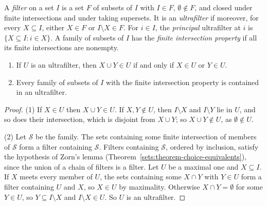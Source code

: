 \begin{definition}\label{model-theory:definition-ultrafilter}
A \emph{filter} on a set $I$ is a set $F$ of subsets of $I$ with $I \in F$, $\emptyset \notin F$, and closed under finite intersections and under taking
supersets. It is an \emph{ultrafilter} if moreover, for every $X \subseteq I$, either $X \in F$ or $I \setminus X \in F$. For $i \in I$, the \emph{principal}
ultrafilter at $i$ is $\{X \subseteq I : i \in X\}$. A family of subsets of $I$ has the \emph{finite intersection property} if all its finite intersections are
nonempty.
\end{definition}

\begin{lemma}\label{model-theory:lemma-ultrafilters}
\begin{enumerate}
\item If $U$ is an ultrafilter, then $X \cup Y \in U$ if and only if $X \in U$ or $Y \in U$.
\item Every family of subsets of $I$ with the finite intersection property is contained in an ultrafilter.
\end{enumerate}
\end{lemma}

\begin{proof}
(1) If $X \in U$ then $X \cup Y \in U$. If $X, Y \notin U$, then $I \setminus X$ and $I \setminus Y$ lie in $U$, and so does their intersection, which is disjoint
from $X \cup Y$; so $X \cup Y \notin U$, as $\emptyset \notin U$.

(2) Let $\mathcal{S}$ be the family. The sets containing some finite intersection of members of $\mathcal{S}$ form a filter containing $\mathcal{S}$. Filters
containing $\mathcal{S}$, ordered by inclusion, satisfy the hypothesis of Zorn's lemma (Theorem~\ref{sets:theorem-choice-equivalents}), since the union of a
chain of filters is a filter. Let $U$ be a maximal one and $X \subseteq I$. If $X$ meets every member of $U$, the sets containing some $X \cap Y$ with $Y \in U$
form a filter containing $U$ and $X$, so $X \in U$ by maximality. Otherwise $X \cap Y = \emptyset$ for some $Y \in U$, so $Y \subseteq I \setminus X$ and
$I \setminus X \in U$. So $U$ is an ultrafilter.
\end{proof}

